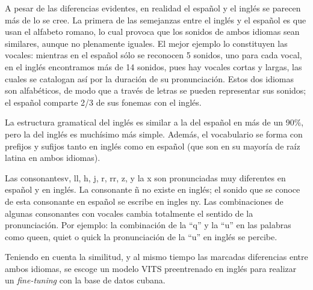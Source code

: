 A pesar de las diferencias evidentes, en realidad el español y el inglés se parecen más de lo se cree. La primera de las semejanzas entre el inglés y el español es que usan el alfabeto romano, lo cual provoca que los sonidos de ambos idiomas sean similares, aunque no plenamente iguales. El mejor ejemplo lo constituyen las vocales: mientras en el español sólo se reconocen 5 sonidos, uno para cada vocal, en el inglés encontramos más de 14 sonidos, pues hay vocales cortas y largas, las cuales se catalogan así por la duración de su pronunciación. Estos dos idiomas son alfabéticos, de modo que a través de letras se pueden representar sus sonidos; el español comparte 2/3 de sus fonemas con el inglés.

La estructura gramatical del inglés es similar a la del español en más de un 90$\%$, pero la del inglés es muchísimo más simple. Además, el vocabulario se forma con prefijos y sufijos tanto en inglés como en español (que son en su mayoría de raíz latina en ambos idiomas).



Las consonantesv, ll, h, j, r, rr, z, y  la x son pronunciadas muy diferentes en español y en inglés. La consonante ñ no existe en inglés; el sonido que se conoce de esta consonante en español se escribe en ingles ny. Las combinaciones de algunas consonantes con vocales cambia totalmente el sentido de la pronunciación. Por ejemplo: la combinación de la “q” y la “u” en las palabras como queen, quiet o quick la pronunciación de  la “u” en inglés se percibe.

Teniendo en cuenta la similitud, y al mismo tiempo las marcadas diferencias entre ambos idiomas, se escoge un modelo VITS preentrenado en inglés para realizar un \textit{fine-tuning} con la base de datos cubana.
